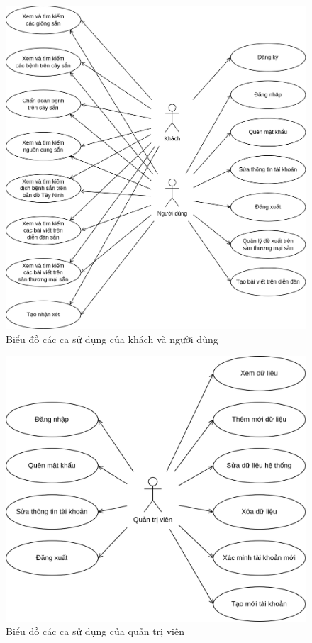 \documentclass[./../main.tex]{subfiles}
\begin{document}
\begin{figure}[H]
    \centering
    \includegraphics[height=\linewidth]{./img/uc-g-u.png}
    \caption{Biểu đồ các ca sử dụng của khách và người dùng}
\end{figure}

\begin{figure}[H]
    \centering
    \includegraphics[height=0.6\linewidth]{./img/uc-admin.png}
    \caption{Biểu đồ các ca sử dụng của quản trị viên}
\end{figure}
\end{document}
